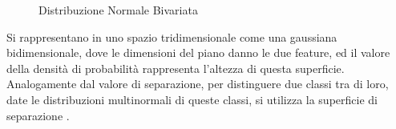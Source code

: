 \documentclass{article}
\numberwithin{equation}{subsection}
\begin{document}
\begin{figure}[H]%
    \centering 
    \qquad
    \caption{Distribuzione Normale Bivariata}
\end{figure}

Si rappresentano in uno spazio tridimensionale come una gaussiana bidimensionale, dove 
le dimensioni del piano danno le due feature, ed il valore della densità di probabilità rappresenta l'altezza di questa superficie. 
Analogamente dal valore di separazione, per distinguere due classi tra di loro, date le distribuzioni multinormali di queste classi, si utilizza la superficie di separazione . 
\end{document}
